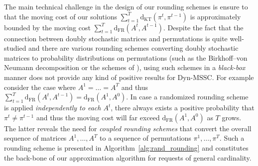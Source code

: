 \documentclass[a4paper,UKenglish,cleveref,autoref, thm-restate]{lipics-v2019}
\def\DSSC{\mathrm{Dyn}\text{-}\mathrm{MSSC}}
\def\dkt{\mathrm{d}_{\mathrm{KT}}}
\def\dfr{\mathrm{d}_{\mathrm{FR}}}
\begin{document}
The main technical challenge in the design of our rounding schemes is ensure to that the moving cost of our solutions $\sum_{t=1}^T\dkt(\pi^t,\pi^{t-1})$ is approximately bounded by the moving cost $\sum_{t=1}^T\dfr(A^t,A^{t-1})$. Despite the fact that the connection between 
doubly stochastic matrices and permutations is quite well-studied
and there are various rounding schemes converting doubly stochastic matrices to probability distributions on permutations (such as the Birkhoff–von Neumann decomposition or the schemes of \cite{BGK10,SW11,BBFT20,FKKSV20}), using such schemes in a \textit{black-box} manner does not provide any kind of positive results for $\DSSC$. For example consider the case where $A^1 = \dots = A^T$ and thus $\sum_{t=1}^T \dfr(A^t,A^{t-1}) = \dfr(A^1,A^0)$. In case a randomized rounding scheme is applied \textit{independently to each $A^t$}, there always exists a positive probability that $\pi^t \neq \pi^{t-1}$ and thus the moving cost will far exceed $\dfr(A^1,A^0)$ as $T$ grows. The latter reveals the need for \textit{coupled rounding schemes} that convert the overall sequence of matrices $A^1,\ldots,A^T$ to a sequence of permutations $\pi^1,\ldots,\pi^T$. Such a rounding scheme is presented in Algorithm~\ref{alg:rand_rounding} and constitutes the back-bone of our approximation algorithm for requests of general cardinality.
\end{document}
